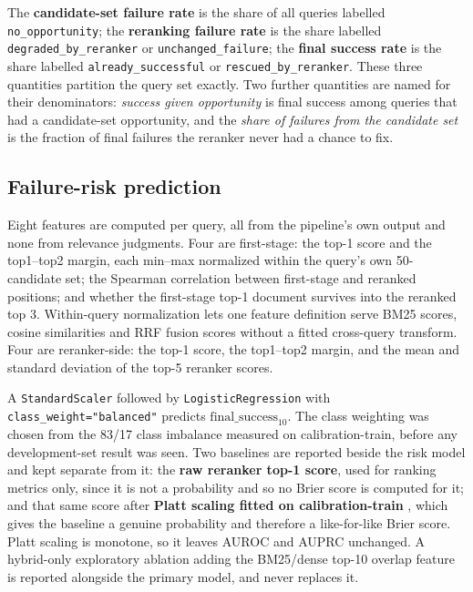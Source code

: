 \documentclass[11pt,a4paper]{article}
\newcommand{\fin}{\ensuremath{\mathrm{final\_success}_{10}}}
\begin{document}
The \textbf{candidate-set failure rate} is the share of all queries labelled
\texttt{no\_opportunity}; the \textbf{reranking failure rate} is the share labelled
\texttt{degraded\_by\_reranker} or \texttt{unchanged\_failure}; the \textbf{final success rate}
is the share labelled \texttt{already\_successful} or \texttt{rescued\_by\_reranker}. These
three quantities partition the query set exactly. Two further quantities are named for their
denominators: \emph{success given opportunity} is final success among queries that had a
candidate-set opportunity, and the \emph{share of failures from the candidate set} is the
fraction of final failures the reranker never had a chance to fix.

\subsection{Failure-risk prediction}
\label{sec:riskmodel}

Eight features are computed per query, all from the pipeline's own output and none from
relevance judgments. Four are first-stage: the top-1 score and the top1--top2 margin, each
min--max normalized within the query's own 50-candidate set; the Spearman correlation between
first-stage and reranked positions; and whether the first-stage top-1 document survives into the
reranked top 3. Within-query normalization lets one feature definition serve BM25 scores, cosine
similarities and RRF fusion scores without a fitted cross-query transform. Four
are reranker-side: the top-1 score, the top1--top2 margin, and the mean and standard deviation
of the top-5 reranker scores.

A \texttt{StandardScaler} followed by \texttt{LogisticRegression} with
\texttt{class\_weight="balanced"} predicts $\fin$. The class weighting was chosen from the 83/17
class imbalance measured on calibration-train, before any development-set result was seen. Two
baselines are reported beside the risk model and kept separate from it: the \textbf{raw reranker
top-1 score}, used for ranking metrics only, since it is not a probability and so no Brier score
is computed for it; and that same score after \textbf{Platt scaling fitted on calibration-train}
\citep{platt1999probabilistic}, which gives the baseline a genuine probability and therefore a
like-for-like Brier score. Platt scaling is monotone, so it leaves AUROC and AUPRC unchanged. A
hybrid-only exploratory ablation adding the BM25/dense top-10 overlap feature is reported
alongside the primary model, and never replaces it.
\end{document}
